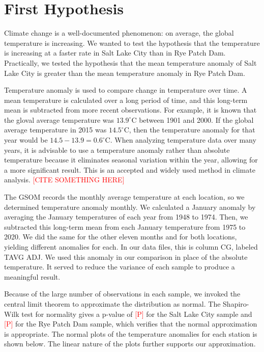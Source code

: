 \documentclass[final]{siamart1116}
\begin{document}
\section{First Hypothesis}

Climate change is a well-documented phenomenon: on average, the global temperature is increasing. We wanted to test the hypothesis that the temperature is increasing at a faster rate in Salt Lake City than in Rye Patch Dam. Practically, we tested the hypothesis that the mean temperature anomaly of Salt Lake City is greater than the mean temperature anomaly in Rye Patch Dam.

Temperature anomaly is used to compare change in temperature over time. A mean temperature is calculated over a long period of time, and this long-term mean is subtracted from more recent observations. For example, it is known that the gloval average temperature was $13.9^{\circ}$C between 1901 and 2000. If the global average temperature in 2015 was $14.5^{\circ}$C, then the temperature anomaly for that year would be $14.5 - 13.9 = 0.6^{\circ}$C. When analyzing temperature data over many years, it is advisable to use a temperature anomaly rather than absolute temperature because it eliminates seasonal variation within the year, allowing for a more significant result. This is an accepted and widely used method in climate analysis. \textcolor{red}{[CITE SOMETHING HERE]}

The GSOM records the monthly average temperature at each location, so we determined temperature anomaly monthly. We calculated a January anomaly by averaging the January temperatures of each year from 1948 to 1974. Then, we subtracted this long-term mean from each January temperature from 1975 to 2020. We did the same for the other eleven months and for both locations, yielding different anomalies for each. In our data files, this is column CG, labeled TAVG ADJ. We used this anomaly in our comparison in place of the absolute temperature. It served to reduce the variance of each sample to produce a meaningful result.

Because of the large number of observations in each sample, we invoked the central limit theorem to approximate the distribution as normal. The Shapiro-Wilk test for normality gives a p-value of \textcolor{red}{[P]} for the Salt Lake City sample and \textcolor{red}{[P]} for the Rye Patch Dam sample, which verifies that the normal approximation is appropriate. The normal plots of the temperature anomalies for each station is shown below. The linear nature of the plots further supports our approximation.
\end{document}
